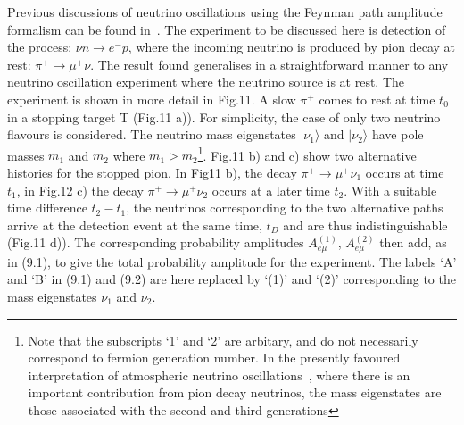 { \par Previous discussions of neutrino oscillations using the Feynman path amplitude formalism
  can be found in~\cite{JHF1,JHF2,JHF3}. The experiment to be discussed here is detection of the
  process: $ \nu n \rightarrow e^- p$, where the incoming neutrino is produced by pion decay at rest:
   $\pi^+ \rightarrow \mu^+ \nu$. The result found generalises in a straightforward manner to 
  any neutrino oscillation experiment where the neutrino source is at rest.  The experiment
  is shown in more detail in Fig.11. A slow $\pi^+$ comes to rest at time $t_0$ in a stopping
  target T (Fig.11 a)). For simplicity, the case of only two neutrino flavours is considered. The neutrino
  mass eigenstates $|\nu_1\rangle$ and $|\nu_2\rangle$ have pole masses $m_1$ and $m_2$ where
   $m_1 > m_2$\footnote{ Note that the subscripts `1' and `2' are arbitary, and do not necessarily
   correspond to fermion generation number. In the presently favoured interpretation of
    atmospheric neutrino oscillations~\cite{Kays04}, where there is an important
   contribution from pion decay neutrinos, the mass eigenstates are those 
  associated with the second and third generations}.
   Fig.11 b) and c) show two alternative histories for the stopped pion. 
   In Fig11 b), the decay  $\pi^+ \rightarrow \mu^+ \nu_1$ occurs at time $t_1$, in Fig.12 c) 
    the decay $\pi^+ \rightarrow \mu^+ \nu_2$ occurs at a later time $t_2$. With a suitable 
   time difference $t_2-t_1$, the neutrinos corresponding to the two alternative
  paths arrive at the detection event at the same time, $t_D$ and are thus indistinguishable
  (Fig.11 d)). The corresponding probability amplitudes $A_{e\mu}^{(1)}$,  $A_{e\mu}^{(2)}$
   then add, as in (9.1), to give the total probability amplitude for the experiment.
   The labels `A' and `B' in (9.1) and (9.2) are here replaced by `(1)' and `(2)' corresponding
    to the mass eigenstates $\nu_1$ and  $\nu_2$.

}
